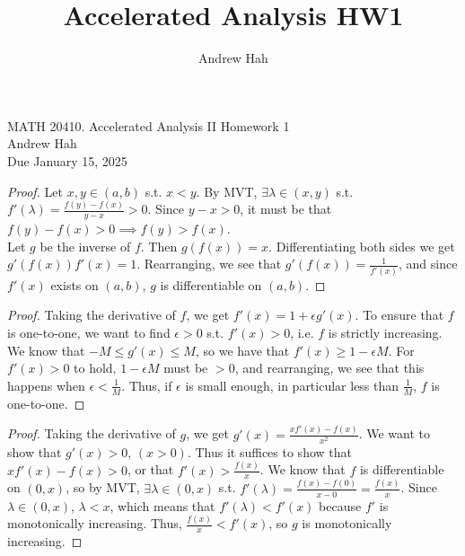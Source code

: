 \documentclass[11pt]{article}
\title{Accelerated Analysis HW1}
\author{Andrew Hah}
\begin{document}
\pagestyle{plain}
\begin{center}
{\Large MATH 20410. Accelerated Analysis II Homework 1} \\ 
\vspace{.2in}  
Andrew Hah \\
Due January 15, 2025
\end{center}

\begin{exercise}{5.2}
    \begin{proof}
        Let $x, y \in (a, b)$ s.t. $x < y$. By MVT, $\exists \lambda \in (x, y)$ s.t. $f'(\lambda) = \frac{f(y) - f(x)}{y - x} > 0$. Since $y - x > 0$, it must be that $f(y) - f(x) > 0 \implies f(y) > f(x)$. \\

        Let $g$ be the inverse of $f$. Then $g(f(x)) = x$. Differentiating both sides we get $g'(f(x)) f'(x) = 1$. Rearranging, we see that $g'(f(x)) = \frac{1}{f'(x)}$, and since $f'(x)$ exists on $(a, b)$, $g$ is differentiable on $(a, b)$. 
    \end{proof}
\end{exercise}

\begin{exercise}{5.3}
    \begin{proof}
        Taking the derivative of $f$, we get $f'(x) = 1 + \epsilon g'(x)$. To ensure that $f$ is one-to-one, we want to find $\epsilon > 0$ s.t. $f'(x) > 0$, i.e. $f$ is strictly increasing. We know that $-M \le g'(x) \le M$, so we have that $f'(x) \ge 1 - \epsilon M$. For $f'(x) > 0$ to hold, $1 - \epsilon M$ must be $>0$, and rearranging, we see that this happens when $\epsilon < \frac{1}{M}$. Thus, if $\epsilon$ is small enough, in particular less than $\frac{1}{M}$, $f$ is one-to-one. 
    \end{proof}
\end{exercise}

\begin{exercise}{5.6}
    \begin{proof}
        Taking the derivative of $g$, we get $g'(x) = \frac{xf'(x) - f(x)}{x^2}$. We want to show that $g'(x) > 0$, $(x > 0)$. Thus it suffices to show that $xf'(x) - f(x) > 0$, or that $f'(x) > \frac{f(x)}{x}$. We know that $f$ is differentiable on $(0, x)$, so by MVT, $\exists \lambda \in (0, x)$ s.t. $f'(\lambda) = \frac{f(x) - f(0)}{x - 0} = \frac{f(x)}{x}$. Since $\lambda \in (0, x)$, $\lambda < x$, which means that $f'(\lambda) < f'(x)$ because $f'$ is monotonically increasing. Thus, $\frac{f(x)}{x} < f'(x)$, so $g$ is monotonically increasing. 
    \end{proof}
\end{exercise}
\end{document}
